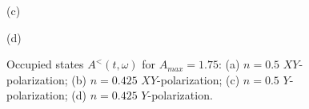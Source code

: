\begin{figure}[h!]
\begin{minipage}[h]{0.5\linewidth}
 (c) \\
\end{minipage}
\hfill
\begin{minipage}[h]{0.5\linewidth}
 (d) \\
\end{minipage}
\caption{Occupied states $A^{<}(t,\omega)$ for $A_{max}=1.75$: (a) $n=0.5$ $XY$-polarization; (b) $n=0.425$ $XY$-polarization; (c) $n=0.5$ $Y$-polarization; (d) $n=0.425$ $Y$-polarization. }
\label{fig:G_loc_les_w_t_tp}
\end{figure}

